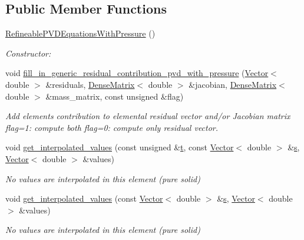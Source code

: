 \subsection*{Public Member Functions}
\begin{DoxyCompactItemize}
\item 
\hyperlink{classoomph_1_1RefineablePVDEquationsWithPressure_aba4ecfaa4b35b47d3279cd6887e2175a}{Refineable\+P\+V\+D\+Equations\+With\+Pressure} ()
\begin{DoxyCompactList}\small\item\em Constructor\+: \end{DoxyCompactList}\item 
void \hyperlink{classoomph_1_1RefineablePVDEquationsWithPressure_a5772ce11dd9bc9e7bdf0a2463fc753d5}{fill\+\_\+in\+\_\+generic\+\_\+residual\+\_\+contribution\+\_\+pvd\+\_\+with\+\_\+pressure} (\hyperlink{classoomph_1_1Vector}{Vector}$<$ double $>$ \&residuals, \hyperlink{classoomph_1_1DenseMatrix}{Dense\+Matrix}$<$ double $>$ \&jacobian, \hyperlink{classoomph_1_1DenseMatrix}{Dense\+Matrix}$<$ double $>$ \&mass\+\_\+matrix, const unsigned \&flag)
\begin{DoxyCompactList}\small\item\em Add element\textquotesingle{}s contribution to elemental residual vector and/or Jacobian matrix flag=1\+: compute both flag=0\+: compute only residual vector. \end{DoxyCompactList}\item 
void \hyperlink{classoomph_1_1RefineablePVDEquationsWithPressure_a15ee8b0656b7957c7063aefc3acc5d50}{get\+\_\+interpolated\+\_\+values} (const unsigned \&\hyperlink{cfortran_8h_af6f0bd3dc13317f895c91323c25c2b8f}{t}, const \hyperlink{classoomph_1_1Vector}{Vector}$<$ double $>$ \&\hyperlink{cfortran_8h_ab7123126e4885ef647dd9c6e3807a21c}{s}, \hyperlink{classoomph_1_1Vector}{Vector}$<$ double $>$ \&values)
\begin{DoxyCompactList}\small\item\em No values are interpolated in this element (pure solid) \end{DoxyCompactList}\item 
void \hyperlink{classoomph_1_1RefineablePVDEquationsWithPressure_a4e4bd0c67eaefb3f34a0744d17d07567}{get\+\_\+interpolated\+\_\+values} (const \hyperlink{classoomph_1_1Vector}{Vector}$<$ double $>$ \&\hyperlink{cfortran_8h_ab7123126e4885ef647dd9c6e3807a21c}{s}, \hyperlink{classoomph_1_1Vector}{Vector}$<$ double $>$ \&values)
\begin{DoxyCompactList}\small\item\em No values are interpolated in this element (pure solid) \end{DoxyCompactList}\item 

\end{DoxyCompactItemize}
